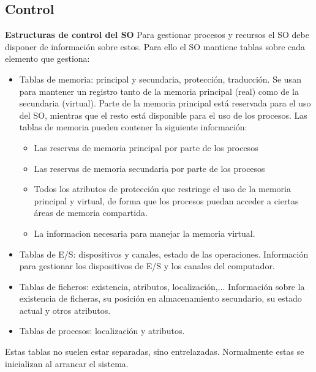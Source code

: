 \documentclass{article}
\begin{document}
\subsection{Control}
\textbf{Estructuras de control del SO}
Para gestionar procesos y recursos el SO debe disponer de información sobre estos. Para ello el SO mantiene tablas sobre cada elemento que gestiona:
\begin{itemize}
\item Tablas de memoria: principal y secundaria, protección, traducción. Se usan para mantener un registro tanto de la memoria principal (real) como de la secundaria (virtual). Parte de la memoria principal está reservada para el uso del SO, mientras que el resto está disponible para el uso de los procesos. Las tablas de memoria pueden contener la siguiente información:
	\begin{itemize}
	\item Las reservas de memoria principal por parte de los procesos
	
	\item Las reservas de memoria secundaria por parte de los procesos
	
	\item Todos los atributos de protección que restringe el uso de la memoria principal y virtual, de forma que los procesos puedan acceder a ciertas áreas de memoria compartida.
	
	\item La informacion necesaria para manejar la memoria virtual.
	\end{itemize}

\item Tablas de E/S: dispositivos y canales, estado de las operaciones. Información para gestionar los dispositivos de E/S y los canales del computador.

\item Tablas de ficheros: existencia, atributos, localización,... Información sobre la existencia de ficheras, su posición en almacenamiento secundario, su estado actual y otros atributos.

\item Tablas de procesos: localización y atributos. 
\end{itemize}

Estas tablas no suelen estar separadas, sino entrelazadas. Normalmente estas se inicializan al arrancar el sistema.\\
\end{document}
